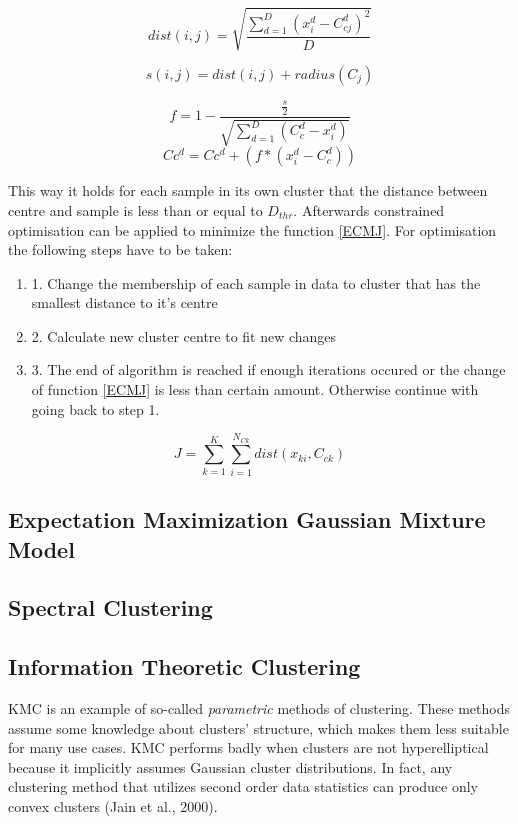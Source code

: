 \documentclass[conference]{IEEEtran}
\begin{document}
\begin{equation}\label{ECMdist}
dist(i,j) = \sqrt{ \frac {\sum_{d=1}^{D} (x_i^d - C_{cj}^d)^2} {D}}
\end{equation}

\begin{equation}\label{ECMequ1}
s(i, j) = dist(i,j) + radius(C_j)
\end{equation}

\begin{equation}\label{ECMequ2}
f = 1 - \frac {\frac {s} {2}} {\sqrt{ \sum_{d=1}^{D} (C_c^d - x_i^d)}}
\end{equation}
\begin{equation}\label{ECMequ3}
Cc^d = Cc^d + (f * (x_i^d - C_c^d))
\end{equation}

This way it holds for each sample in its own cluster that the distance between centre and sample is less than or equal to $D_{thr}$. Afterwards constrained optimisation can be applied to minimize the function \ref{ECMJ}. For optimisation the following steps have to be taken:
\begin{enumerate}
\item 1. Change the membership of each sample in data to cluster that has the smallest distance to it's centre
\item 2. Calculate new cluster centre to fit new changes
\item 3. The end of algorithm is reached if enough iterations occured or the change of function \ref{ECMJ} is less than certain amount. Otherwise continue with going back to step 1.
\end{enumerate}

\begin{equation}\label{ECMJ}
J = \sum_{k=1}^K \sum_{i=1}^{N_{Ck}} dist(x_{ki}, C_{ck})
\end{equation}

\subsection{Expectation Maximization Gaussian Mixture Model}

\subsection{Spectral Clustering}

\subsection{Information Theoretic Clustering}%
KMC is an example of so-called \textit{parametric} methods of clustering. These
methods assume some knowledge about clusters' structure, which makes them less
suitable for many use cases. KMC performs badly when clusters are not hyperelliptical
because it implicitly assumes Gaussian cluster distributions. In fact, any clustering method
that utilizes second order data statistics can produce only convex clusters (Jain et al., 2000).
\end{document}
